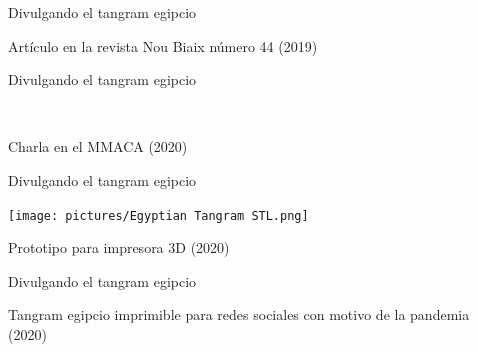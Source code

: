 \documentclass[14pt,aspectratio=169,usenames,dvipsnames]{beamer}
\begin{document}

    \begin{frame}{Divulgando el tangram egipcio}
        \begin{center}
            \begin{minipage}{0.5\textwidth}
                Artículo en la revista Nou Biaix número 44 (2019)
            \end{minipage}\quad\begin{minipage}{0.4\textwidth}
            \end{minipage}
        \end{center}
    \end{frame}


    \begin{frame}{Divulgando el tangram egipcio}
        \begin{center}
             \\\medskip

            Charla en el MMACA (2020)
        \end{center}
    \end{frame}


    \begin{frame}{Divulgando el tangram egipcio}
        \begin{center}
            {\texttt{[image: pictures/Egyptian Tangram STL.png]}} \\\medskip

            Prototipo para impresora 3D (2020)
        \end{center}
    \end{frame}


    \begin{frame}{Divulgando el tangram egipcio}
        \begin{center}
            \begin{minipage}{0.4\textwidth}
            \end{minipage}\quad\begin{minipage}{0.5\textwidth}
                Tangram egipcio imprimible para redes sociales con motivo de la pandemia (2020)
            \end{minipage}
        \end{center}
    \end{frame}
\end{document}
